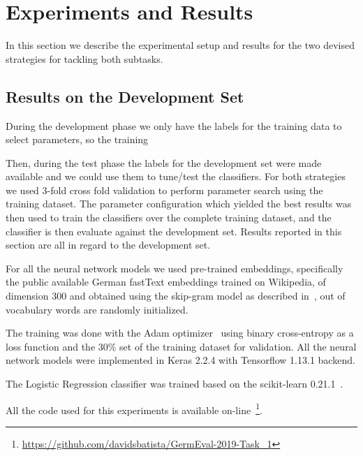 \documentclass[11pt,a4paper]{article}
\begin{document}
\section{Experiments and Results}\label{experiments}

In this section we describe the experimental setup and results for the two
devised strategies for tackling both subtasks.

\subsection{Results on the Development Set}

During the development phase we only have the labels for the training data to
select parameters, so the training

Then, during the test phase the labels for the development set were made available
and we could use them to tune/test the classifiers. For both strategies we used
3-fold cross fold validation to perform parameter
search using the training dataset. The parameter configuration which yielded
the best results was then used to train the classifiers over the complete training
dataset, and the classifier is then evaluate against the development set. Results
reported in this section are all in regard to the development set.

For all the neural network models we used pre-trained embeddings, specifically
the public available German fastText embeddings trained on Wikipedia, of
dimension 300 and obtained using the skip-gram model as described
in~\citet{bojanowski-etal-2017-enriching}, out of vocabulary words are randomly
initialized.

The training was done with the Adam optimizer~\cite{journals/corr/KingmaB14}
using binary cross-entropy as a loss function and the 30\% set of the training
dataset  for validation. All the neural network models were implemented in
Keras 2.2.4 with Tensorflow 1.13.1 backend.

The Logistic Regression classifier was trained based on the scikit-learn
0.21.1~\cite{Pedregosa:2011:SML:1953048.2078195}.

All the code used for this experiments is available
on-line~\footnote{\url{https://github.com/davidsbatista/GermEval-2019-Task_1}}.
\end{document}
